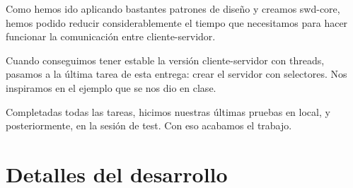 Como hemos ido aplicando bastantes patrones de diseño y creamos swd-core, hemos podido reducir considerablemente el tiempo que necesitamos para hacer funcionar la comunicación entre cliente-servidor.

Cuando conseguimos tener estable la versión cliente-servidor con threads, pasamos a la última tarea de esta entrega: crear el servidor con selectores. Nos inspiramos en el ejemplo que se nos dio en clase.

Completadas todas las tareas, hicimos nuestras últimas pruebas en local, y posteriormente, en la sesión de test. Con eso acabamos el trabajo.

\newpage
\section*{Detalles del desarrollo}


\newpage
